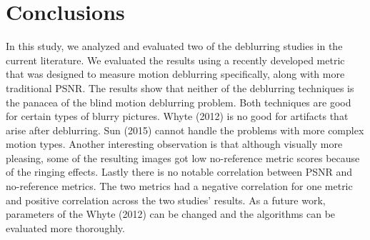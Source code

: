 \documentclass[10pt,twocolumn,letterpaper]{article}
\begin{document}
\section{Conclusions}
In this study, we analyzed and evaluated two of the deblurring studies in the current literature. We evaluated the results using a recently developed metric that was designed to measure motion deblurring specifically, along with more traditional PSNR. The results show that neither of the deblurring techniques is the panacea of the blind motion deblurring problem. Both techniques are good for certain types of blurry pictures. Whyte \etal (2012) is no good for artifacts that arise after deblurring. Sun \etal (2015) cannot handle the problems with more complex motion types. Another interesting observation is that although visually more pleasing, some of the resulting images got low no-reference metric scores because of the ringing effects. Lastly there is no notable correlation between PSNR and no-reference metrics. The two metrics had a negative correlation for one metric and positive correlation across the two studies' results. As a future work, parameters of the Whyte \etal (2012) can be changed and the algorithms can be evaluated more thoroughly. 



{\small


}
\end{document}
